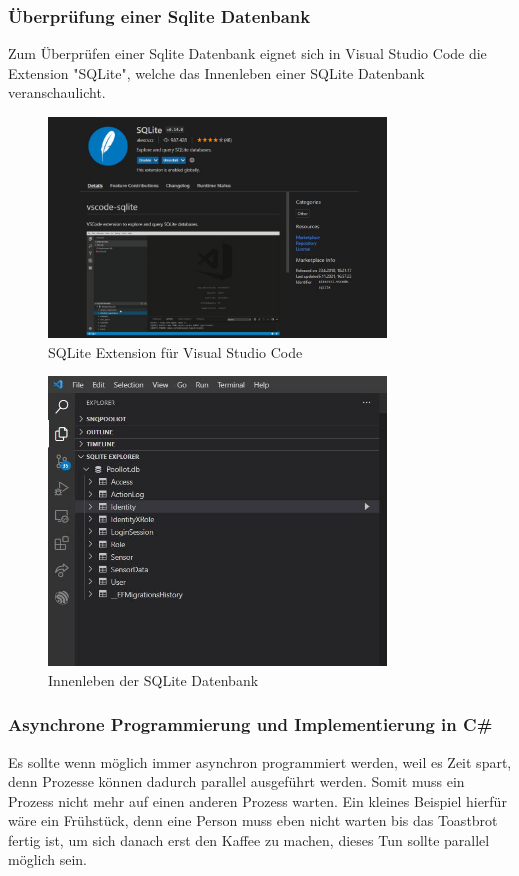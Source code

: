 \subsubsection*{Überprüfung einer Sqlite Datenbank}
Zum Überprüfen einer Sqlite Datenbank eignet sich in Visual Studio Code die Extension "SQLite", 
welche das Innenleben einer SQLite Datenbank veranschaulicht.

\begin{figure}[H]
    \centering
    \includegraphics[width=0.8\textwidth]{./pics/SQLiteVSCodeExtension.JPG}
    \caption{SQLite Extension für Visual Studio Code}
\end{figure}

\begin{figure}[H]
    \centering
    \includegraphics[width=0.8\textwidth]{./pics/SQLiteDatabaseStructure.JPG}
    \caption{Innenleben der SQLite Datenbank}
\end{figure}



\subsubsection*{Asynchrone Programmierung und Implementierung in C\#}
Es sollte wenn möglich immer asynchron programmiert werden, weil es Zeit spart, denn Prozesse können dadurch parallel ausgeführt werden.
Somit muss ein Prozess nicht mehr auf einen anderen Prozess warten.
Ein kleines Beispiel hierfür wäre ein Frühstück, denn eine Person muss eben nicht warten bis das Toastbrot fertig ist, um sich danach erst den Kaffee zu machen, dieses Tun sollte parallel möglich sein.

